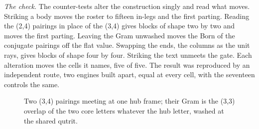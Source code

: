 \begin{chproof}
\textit{The check.} The counter-tests alter the construction singly and read what moves. Striking a body moves the roster to fifteen in-legs and the first parting. Reading the (2,4) pairings in place of the (3,4) gives blocks of shape two by two and moves the first parting. Leaving the Gram unwashed moves the Born of the conjugate pairings off the flat value. Swapping the ends, the columns as the unit rays, gives blocks of shape four by four. Striking the text unmeets the gate. Each alteration moves the cells it names, five of five. The result was reproduced by an independent route, two engines built apart, equal at every cell, with the seventeen controls the same.
\begin{figure}[h]\centering{}\caption{Two (3,4) pairings meeting at one hub frame; their Gram is the (3,3) overlap of the two core letters whatever the hub letter, washed at the shared qutrit.}\end{figure}
\end{chproof}
\par\medskip{}\label{narr:close:6-7}\par

